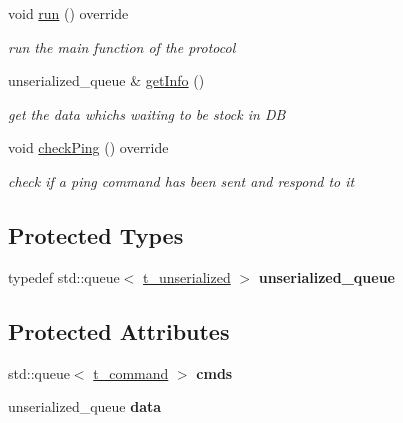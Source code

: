 \begin{DoxyCompactItemize}
void \hyperlink{classspider_1_1_server_protocol_ad3198a38584d643bd0eb9d86ca1213b4}{run} () override
\begin{DoxyCompactList}\small\item\em run the main function of the protocol \end{DoxyCompactList}\item 
unserialized\+\_\+queue \& \hyperlink{classspider_1_1_server_protocol_a3941b100fc61ae3815f2c1fec004edc0}{get\+Info} ()
\begin{DoxyCompactList}\small\item\em get the data which\textquotesingle{}s waiting to be stock in DB \end{DoxyCompactList}\item 
\mbox{\label{classspider_1_1_server_protocol_a9d5d13c8c470e6ef400a08f210b161c7}} 
void \hyperlink{classspider_1_1_server_protocol_a9d5d13c8c470e6ef400a08f210b161c7}{check\+Ping} () override
\begin{DoxyCompactList}\small\item\em check if a ping command has been sent and respond to it \end{DoxyCompactList}\end{DoxyCompactItemize}
\subsection*{Protected Types}
\begin{DoxyCompactItemize}
\item 
\mbox{\label{classspider_1_1_server_protocol_af4defcdbe67c7343aaa47e1bd4387dd7}} 
typedef std\+::queue$<$ \hyperlink{structt__unserialized}{t\+\_\+unserialized} $>$ {\bfseries unserialized\+\_\+queue}
\end{DoxyCompactItemize}
\subsection*{Protected Attributes}
\begin{DoxyCompactItemize}
\item 
\mbox{\label{classspider_1_1_server_protocol_af3afac390ff0d3f18150b4fbb57d883c}} 
std\+::queue$<$ \hyperlink{structt__command}{t\+\_\+command} $>$ {\bfseries cmds}
\item 
\mbox{\label{classspider_1_1_server_protocol_a051e06bc57c2087fc14d38d1e16adb9f}} 
unserialized\+\_\+queue {\bfseries data}
\end{DoxyCompactItemize}
